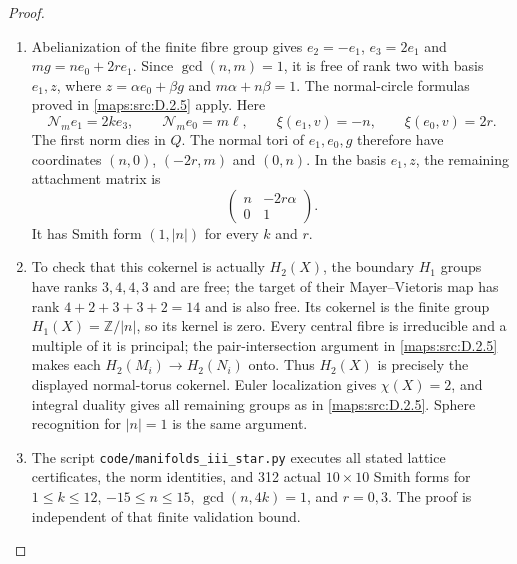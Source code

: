 \begin{proof}
\begin{enumerate}[label=\arabic*.,leftmargin=*]
\item Abelianization of the finite fibre group gives
$e_2=-e_1$, $e_3=2e_1$ and
$mg=ne_0+2r e_1$. Since $\gcd(n,m)=1$, it is free of rank
two with basis $e_1,z$, where
$z=\alpha e_0+\beta g$ and $m\alpha+n\beta=1$.
The normal-circle formulas proved in \ref{maps:src:D.2.5} apply. Here
\[
 \mathcal N_me_1=2k e_3,\qquad
 \mathcal N_me_0=m\ell,\qquad
 \xi(e_1,v)=-n,\qquad \xi(e_0,v)=2r.
\]
The first norm dies in $Q$. The normal tori of $e_1,e_0,g$
therefore have coordinates $(n,0)$, $(-2r,m)$ and $(0,n)$.
In the basis $e_1,z$, the remaining attachment matrix is
\[
 \begin{pmatrix}n&-2r\alpha\\0&1\end{pmatrix}.
\]
It has Smith form $(1,|n|)$ for every $k$ and $r$.

\item To check that this cokernel is actually $H_2(X)$, the boundary
$H_1$ groups have ranks $3,4,4,3$ and are free; the target
of their Mayer--Vietoris map has rank
$4+2+3+3+2=14$ and is also free. Its cokernel is the finite
group $H_1(X)=\mathbb Z/|n|$, so its kernel is zero.
Every central fibre is irreducible and a multiple of it is
principal; the pair-intersection argument in \ref{maps:src:D.2.5} makes each
$H_2(M_i)\to H_2(N_i)$ onto. Thus $H_2(X)$ is precisely
the displayed normal-torus cokernel. Euler localization gives
$\chi(X)=2$, and integral duality gives all remaining groups
as in \ref{maps:src:D.2.5}. Sphere recognition for $|n|=1$ is the same argument.

\item The script \texttt{code/manifolds\_iii\_star.py} executes all
stated lattice certificates, the norm identities, and 312 actual
$10\times10$ Smith forms for $1\leq k\leq12$,
$-15\leq n\leq15$, $\gcd(n,4k)=1$, and $r=0,3$.
The proof is independent of that finite validation bound.
\end{enumerate}
\end{proof}

